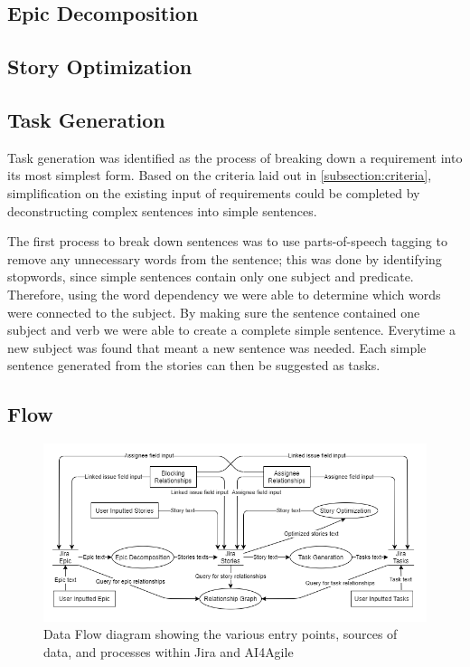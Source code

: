 \subsection{Epic Decomposition}


\subsection{Story Optimization}


\subsection{Task Generation}

Task generation was identified as the process of breaking down a requirement into its most simplest form. Based on the criteria laid out in \ref{subsection:criteria}, simplification on the existing input of requirements could be completed by deconstructing complex sentences into simple sentences. 

The first process to break down sentences was to use parts-of-speech tagging to remove any unnecessary words from the sentence; this was done by identifying stopwords, since simple sentences contain only one subject and predicate. Therefore, using the word dependency we were able to determine which words were connected to the subject. By making sure the sentence contained one subject and verb we were able to create a complete simple sentence. Everytime a new subject was found that meant a new sentence was needed. Each simple sentence generated from the stories can then be suggested as tasks.

\subsection{Flow}

\begin{figure}
\centerline{\includegraphics[width=\textwidth,height=\textheight,keepaspectratio]{./figure/DataflowDiagram.png}}
\caption{Data Flow diagram showing the various entry points, sources of data, and processes within Jira and AI4Agile}
\end{figure}

